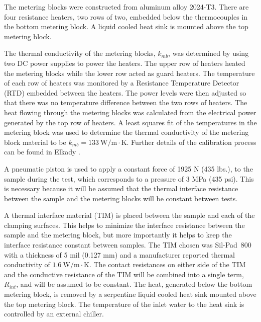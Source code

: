 The metering blocks were constructed from aluminum alloy 2024-T3.  There are four resistance heaters, two rows of two, embedded below the thermocouples in the bottom metering block.  A liquid cooled heat sink is mounted above the top metering block.  

The thermal conductivity of the metering blocks, \(k_{mb}\), was determined by using two DC power supplies to power the heaters.  The upper row of heaters heated the metering blocks while the lower row acted as guard heaters.  The temperature of each row of heaters was monitored by a Resistance Temperature Detector (RTD) embedded between the heaters. The power levels were then adjusted so that there was no temperature difference between the two rows of heaters.  The heat flowing through the metering blocks was calculated from the electrical power generated by the top row of heaters.  A least squares fit of the temperatures in the metering block was used to determine the thermal conductivity of the metering block material to be \(k_{mb}=133\:\mathrm{W/m\cdot K}\).  Further details of the calibration process can be found in Elkady \cite{Elkady2005}.

A pneumatic piston is used to apply a constant force of  1925 N (435 lbs.), to the sample during the test, which corresponds to a pressure of 3 MPa (435 psi).  This is necessary because it will be assumed that the thermal interface resistance between the sample and the metering blocks will be constant between tests.  

A thermal interface material (TIM) is placed between the sample and each of the clamping surfaces.  This helps to minimize the interface resistance between the sample and the metering block, but more importantly it helps to keep the interface resistance constant between samples.  The TIM chosen was Sil-Pad\textregistered ~800 with a thickness of 5 mil (0.127 mm) and a manufacturer reported thermal conductivity of \(1.6\:\mathrm{W/m\cdot K}\).  The contact resistances on either side of the TIM and the conductive resistance of the TIM will be combined into a single term, \(R_{int}\), and will be assumed to be constant.
The heat, generated below the bottom metering block, is removed by a serpentine liquid cooled heat sink mounted above the top metering block.  The temperature of the inlet water to the heat sink is controlled by an external chiller.  

